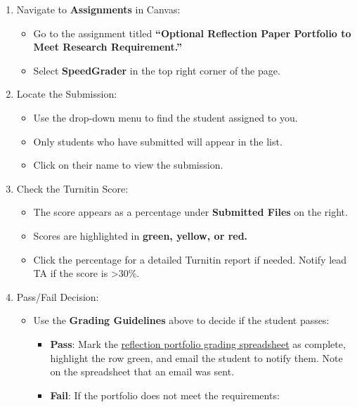 \documentclass[
]{article}
\providecommand{\tightlist}{%
  \setlength{\itemsep}{0pt}\setlength{\parskip}{0pt}}
\begin{document}
\begin{enumerate}
\def\labelenumi{\arabic{enumi}.}
\tightlist
\item
  Navigate to \textbf{Assignments} in Canvas:

  \begin{itemize}
  \tightlist
  \item
    Go to the assignment titled \textbf{``Optional Reflection Paper Portfolio to Meet Research Requirement.''}
  \item
    Select \textbf{SpeedGrader} in the top right corner of the page.
  \end{itemize}
\item
  Locate the Submission:

  \begin{itemize}
  \tightlist
  \item
    Use the drop-down menu to find the student assigned to you.\\
  \item
    Only students who have submitted will appear in the list.\\
  \item
    Click on their name to view the submission.
  \end{itemize}
\item
  Check the Turnitin Score:

  \begin{itemize}
  \tightlist
  \item
    The score appears as a percentage under \textbf{Submitted Files} on the right.\\
  \item
    Scores are highlighted in \textbf{green, yellow, or red.}\\
  \item
    Click the percentage for a detailed Turnitin report if needed. Notify lead TA if the score is \textgreater30\%.
  \end{itemize}
\item
  Pass/Fail Decision:

  \begin{itemize}
  \tightlist
  \item
    Use the \textbf{Grading Guidelines} above to decide if the student passes:

    \begin{itemize}
    \tightlist
    \item
      \textbf{Pass}: Mark the \href{https://docs.google.com/spreadsheets/d/1Svqi-B-zVCOHV6jpabtC8N3SdY7lGWLxTohlPmq__5k/edit?gid=636250357\#gid=636250357}{reflection portfolio grading spreadsheet} as complete, highlight the row green, and email the student to notify them. Note on the spreadsheet that an email was sent.\\
    \item
      \textbf{Fail}: If the portfolio does not meet the requirements:


\end{itemize}
\end{itemize}
\end{enumerate}
\end{document}
